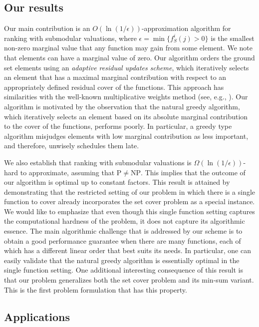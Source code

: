 \documentclass[11pt]{article}
\theoremstyle{plain}
\theoremstyle{definition}
\begin{document}
\subsection{Our results}

Our main contribution is an $O(\ln(1 / \epsilon))$-approximation
algorithm for ranking with submodular valuations, where $\epsilon
= \min \{f^i_S(j) > 0\}$ is the smallest non-zero marginal value
that any function may gain from some element. We note that
elements can have a marginal value of zero. Our algorithm orders
the ground set elements using an \emph{adaptive residual updates
scheme}, which iteratively selects an element that has a maximal
marginal contribution with respect to an appropriately defined
residual cover of the functions. This approach has similarities
with the well-known multiplicative weights method (see, e.g.,
\cite{PlotkinST95,GargK07}). Our algorithm is motivated by the
observation that the natural greedy algorithm, which iteratively
selects an element based on its absolute marginal contribution to
the cover of the functions, performs poorly. In particular, a
greedy type algorithm misjudges elements with low marginal
contribution as less important, and therefore, unwisely schedules
them late.

We also establish that ranking with submodular valuations is
$\Omega(\ln(1 / \epsilon))$-hard to approximate, assuming that
$\mathrm{P} \neq \mathrm{NP}$. This implies that the outcome of
our algorithm is optimal up to constant factors. This result is
attained by demonstrating that the restricted setting of our
problem in which there is a single function to cover already
incorporates the set cover problem as a special instance. We would
like to emphasize that even though this single function setting
captures the computational hardness of the problem, it does not
capture its algorithmic essence. The main algorithmic challenge
that is addressed by our scheme is to obtain a good performance
guarantee when there are many functions, each of which has a
different linear order that best suits its needs. In particular,
one can easily validate that the natural greedy algorithm is
essentially optimal in the single function setting. One additional
interesting consequence of this result is that our problem
generalizes both the set cover problem and its min-sum variant.
This is the first problem formulation that has this property.


\subsection{Applications} \label{subsec:Applications}
\end{document}
